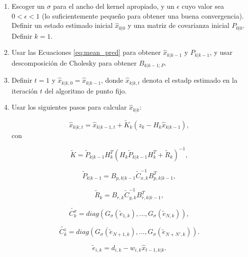 \begin{enumerate}
\item Escoger un $\sigma$ para el ancho del kernel apropiado, y un $\epsilon$ cuyo valor sea $0 < \epsilon < 1$ (lo suficientemente peque\~no para obtener una buena convergencia). Definir un estado estimado inicial $\hat{x}_{0|0}$ y una matriz de covarianza inicial $P_{0|0}$. Definir $k=1$.
\item Usar las Ecuaciones \ref{eq:mean_pred} para obtener $\hat{x}_{k|k-1}$ y $P_{k|k-1}$, y usar descomposici\'on de Cholesky para obtener $B_{k|k-1;P}$.
\item Definir $t=1$ y $\hat{x}_{k|k,0} = \hat{x}_{k|k-1}$, donde $\hat{x}_{k|k,t}$ denota el estadp estimado en la iteraci\'on $t$ del algoritmo de punto fijo.
\item Usar los siguientes pasos para calcular $\hat{x}_{k|k}$:

\begin{equation}
\hat{x}_{k|k,t} = \hat{x}_{k|k-1,t} + \tilde{K}_k (z_k - H_k \hat{x}_{k|k-1}),
\end{equation}
con 

\begin{equation}
\tilde{K} = \tilde{P}_{k|k-1} H_k^T (H_k \tilde{P}_{k|k-1} H_k^T + \tilde{R}_k)^{-1}, 
\label{eq:eq14}
\end{equation}

\begin{equation}
\tilde{P}_{k|k-1} = B_{p, k|k-1} \tilde{C}_{x, k}^{-1}B_{p, k|k-1}^T,
\label{eq:eq13}
\end{equation}

\begin{equation}
\tilde{R}_k = B_{r, k} \tilde{C}_{y, k}^{-1}B_{r, k|k-1}^T,
\label{eq:eq12}
\end{equation}

\begin{equation}
\tilde{C^{x}_{k}}= diag(G_{\sigma}(\tilde{e}_{1, k}),..., G_{\sigma}(\tilde{e}_{N, k})),
\label{eq:eq10}
\end{equation}

\begin{equation}
\tilde{C^{z}_{k}}= diag(G_{\sigma}(\tilde{e}_{N+1, k}),..., G_{\sigma}(\tilde{e}_{N+N', k})).
\label{eq:eq11}
\end{equation}


\begin{equation}
\tilde{e}_{i,k} = d_{i,k} - w_{i,k} \hat{x}_{t-1, k|k}.
\label{eq:eq9}
\end{equation}


\end{enumerate}
